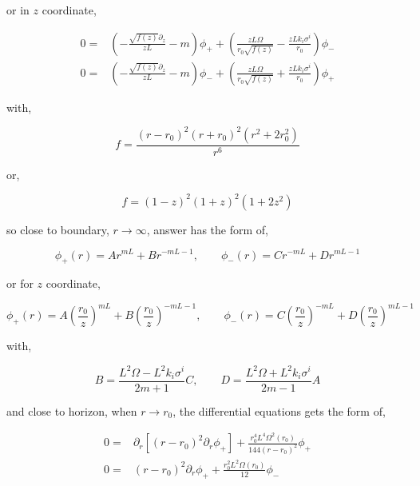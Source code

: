 or in $z$ coordinate,

\begin{align}
    0 =& \left(-\frac{\sqrt{f(z)}\partial_z}{zL} - m \right) \phi_{+} + \left( \frac{zL\Omega}{r_0\sqrt{f(z)}} - \frac{zLk_i\sigma^i}{r_0} \right) \phi_{-} \nonumber\\
    0 =& \left(-\frac{\sqrt{f(z)}\partial_z}{zL} - m \right) \phi_{-} + \left( \frac{zL\Omega}{r_0\sqrt{f(z)}} + \frac{zLk_i\sigma^i}{r_0} \right) \phi_{+}
\end{align}

with,

\begin{equation}
   f = \frac{(r-r_0)^2(r+r_0)^2(r^2+2r_0^2)}{r^6}
\end{equation}

or,

\begin{equation}
   f = (1-z)^2(1+z)^2(1+2z^2)
\end{equation}

so close to boundary, $r\rightarrow \infty$, answer has the form of,

\begin{equation}
   \phi_{+}(r) = Ar^{mL} + Br^{-mL-1}, \qquad \phi_{-}(r) = Cr^{-mL} + Dr^{mL-1}
\end{equation}

or for $z$ coordinate,

\begin{equation}
   \phi_{+}(r) = A\left(\frac{r_0}{z}\right)^{mL} + B\left(\frac{r_0}{z}\right)^{-mL-1}, \qquad \phi_{-}(r) = C\left(\frac{r_0}{z}\right)^{-mL} + D\left(\frac{r_0}{z}\right)^{mL-1}
\end{equation}

with,

\begin{equation}
   B = \frac{L^2\Omega - L^2k_i\sigma^i}{2m + 1}C, \qquad D = \frac{L^2\Omega + L^2k_i\sigma^i}{2m-1}A
\end{equation}

and close to horizon, when $r \rightarrow r_0$, the differential equations gets the form of,

\begin{align}
    0 =& \partial_r\left[(r-r_0)^2\partial_r \phi_{+}\right] + \frac{r_0^4L^4\Omega^2(r_0)}{144(r-r_0)^2}\phi_{+}\nonumber\\
    0 =&  (r-r_0)^2 \partial_r \phi_{+} + \frac{r_0^2L^2\Omega(r_0)}{12} \phi_{-}
\end{align}

